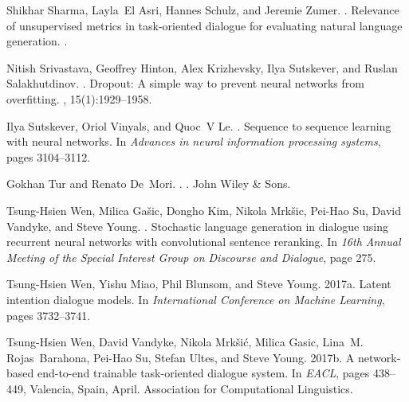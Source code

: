 \documentclass[11pt]{article}
\begin{document}
\begin{thebibliography}{}
	Shikhar Sharma, Layla~El Asri, Hannes Schulz, and Jeremie Zumer.
	.
	\newblock Relevance of unsupervised metrics in task-oriented dialogue for
	evaluating natural language generation.
	.
	
	Nitish Srivastava, Geoffrey Hinton, Alex Krizhevsky, Ilya Sutskever, and Ruslan
	Salakhutdinov.
	.
	\newblock Dropout: A simple way to prevent neural networks from overfitting.
	, 15(1):1929--1958.
	
	Ilya Sutskever, Oriol Vinyals, and Quoc~V Le.
	.
	\newblock Sequence to sequence learning with neural networks.
	\newblock In {\em Advances in neural information processing systems}, pages
	3104--3112.
	
	Gokhan Tur and Renato De~Mori.
	.
	.
	\newblock John Wiley \& Sons.
	
	Tsung-Hsien Wen, Milica Ga{\v{s}}ic, Dongho Kim, Nikola Mrk{\v{s}}ic, Pei-Hao
	Su, David Vandyke, and Steve Young.
	.
	\newblock Stochastic language generation in dialogue using recurrent neural
	networks with convolutional sentence reranking.
	\newblock In {\em 16th Annual Meeting of the Special Interest Group on
		Discourse and Dialogue}, page 275.
	
	Tsung-Hsien Wen, Yishu Miao, Phil Blunsom, and Steve Young.
	\newblock 2017a.
	\newblock Latent intention dialogue models.
	\newblock In {\em International Conference on Machine Learning}, pages
	3732--3741.
	
	Tsung-Hsien Wen, David Vandyke, Nikola Mrk\v{s}i\'{c}, Milica Gasic, Lina~M.
	Rojas~Barahona, Pei-Hao Su, Stefan Ultes, and Steve Young.
	\newblock 2017b.
	\newblock A network-based end-to-end trainable task-oriented dialogue system.
	\newblock In {\em EACL}, pages 438--449, Valencia, Spain, April. Association
	for Computational Linguistics.
	

\end{thebibliography}
\end{document}
